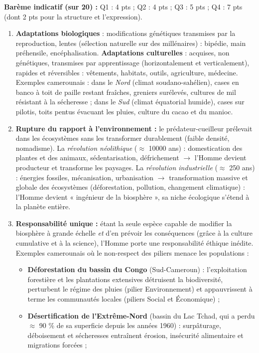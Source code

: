 \documentclass[11pt]{article}
\begin{document}
\begin{corrige}
\textbf{Barème indicatif (sur 20) :} Q1 : 4 pts ; Q2 : 4 pts ; Q3 : 5 pts ; Q4 : 7 pts (dont 2 pts pour la structure et l'expression).
\begin{enumerate}
    \item \textbf{Adaptations biologiques} : modifications génétiques transmises par la reproduction, lentes (sélection naturelle sur des millénaires) : bipédie, main préhensile, encéphalisation. \textbf{Adaptations culturelles} : acquises, non génétiques, transmises par apprentissage (horizontalement et verticalement), rapides et réversibles : vêtements, habitats, outils, agriculture, médecine. Exemples camerounais : dans le \emph{Nord} (climat soudano-sahélien), cases en banco à toit de paille restant fraîches, greniers surélevés, cultures de mil résistant à la sécheresse ; dans le \emph{Sud} (climat équatorial humide), cases sur pilotis, toits pentus évacuant les pluies, culture du cacao et du manioc.
    \item \textbf{Rupture du rapport à l'environnement :} le prédateur-cueilleur prélevait dans les écosystèmes sans les transformer durablement (faible densité, nomadisme). La \emph{révolution néolithique} ($\approx$ \num{10000} ans) : domestication des plantes et des animaux, sédentarisation, défrichement $\rightarrow$ l'Homme devient producteur et transforme les paysages. La \emph{révolution industrielle} ($\approx$ \num{250} ans) : énergies fossiles, mécanisation, urbanisation $\rightarrow$ transformation massive et globale des écosystèmes (déforestation, pollution, changement climatique) : l'Homme devient « ingénieur de la biosphère », sa niche écologique s'étend à la planète entière.
    \item \textbf{Responsabilité unique :} étant la seule espèce capable de modifier la biosphère à grande échelle \emph{et} d'en prévoir les conséquences (grâce à la culture cumulative et à la science), l'Homme porte une responsabilité éthique inédite. Exemples camerounais où le non-respect des piliers menace les populations :
    \begin{itemize}
        \item \textbf{Déforestation du bassin du Congo} (Sud-Cameroun) : l'exploitation forestière et les plantations extensives détruisent la biodiversité, perturbent le régime des pluies (pilier Environnement) et appauvrissent à terme les communautés locales (piliers Social et Économique) ;
        \item \textbf{Désertification de l'Extrême-Nord} (bassin du Lac Tchad, qui a perdu $\approx$ 90 \% de sa superficie depuis les années 1960) : surpâturage, déboisement et sécheresses entraînent érosion, insécurité alimentaire et migrations forcées ;

\end{itemize}
\end{enumerate}
\end{corrige}
\end{document}
